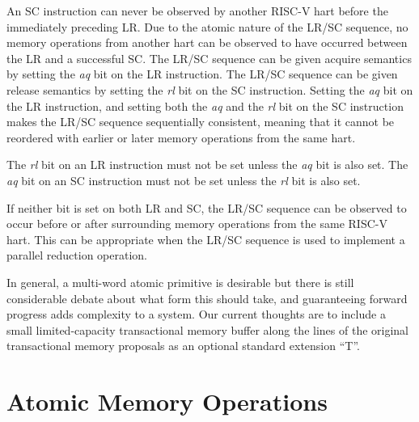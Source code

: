An SC instruction can never be observed by another RISC-V hart
before the immediately preceding LR.  Due to the atomic nature of the
LR/SC sequence, no memory operations from another hart can be observed
to have occurred between the LR and a successful SC.  The LR/SC
sequence can be given acquire semantics by setting the {\em aq} bit on
the LR instruction.  The LR/SC sequence can be given release semantics
by setting the {\em rl} bit on the SC instruction.  Setting the {\em
  aq} bit on the LR instruction, and setting both the {\em aq} and the {\em
  rl} bit on the SC instruction makes the LR/SC sequence sequentially
consistent, meaning that it cannot be reordered with earlier or
later memory operations from the same hart.

The {\em rl} bit on an LR instruction must not be set unless the {\em aq} bit is also set.
The {\em aq} bit on an SC instruction must not be set unless the {\em rl} bit is also set.

If neither bit is set on both LR and SC, the LR/SC sequence can be
observed to occur before or after surrounding memory operations from
the same RISC-V hart.  This can be appropriate when the LR/SC
sequence is used to implement a parallel reduction operation.

\begin{commentary}
In general, a multi-word atomic primitive is desirable but there is
still considerable debate about what form this should take, and
guaranteeing forward progress adds complexity to a system.  Our
current thoughts are to include a small limited-capacity transactional
memory buffer along the lines of the original transactional memory
proposals as an optional standard extension ``T''.
\end{commentary}

\section{Atomic Memory Operations}
\label{sec:amo}


